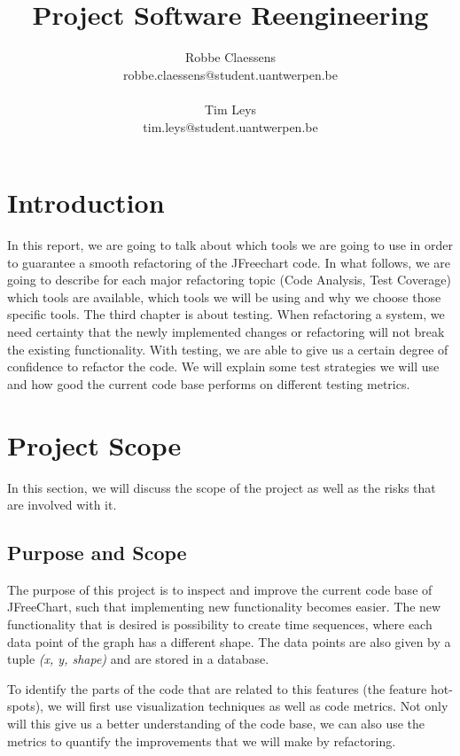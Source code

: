 \documentclass[]{article}
\title{Project Software Reengineering}
\author{Robbe Claessens \\ robbe.claessens@student.uantwerpen.be \\ \\Tim Leys\\tim.leys@student.uantwerpen.be}
\begin{document}
\maketitle



\section{Introduction}
In this report, we are going to talk about which tools we are going to use in order to guarantee a smooth refactoring of the JFreechart code. In what follows, we are going to describe for each major refactoring topic (Code Analysis, Test Coverage) which tools are available, which tools we will be using and why we choose those specific tools. The third chapter is about testing. When refactoring a system, we need certainty that the newly implemented changes or refactoring will not break the existing functionality. With testing, we are able to give us a certain degree of confidence to refactor the code. We will explain some test strategies we will use and how good the current code base performs on different testing metrics.

\section{Project Scope}

In this section, we will discuss the scope of the project as well as the risks that are involved with it.

\subsection{Purpose and Scope}
The purpose of this project is to inspect and improve the current code base of JFreeChart, such that implementing new functionality becomes easier. The new functionality that is desired is possibility to create time sequences, where each data point of the graph has a different shape. The data points are also given by a tuple \textit{(x, y, shape)} and are stored in a database. 

To identify the parts of the code that are related to this features (the feature hot-spots), we will first use visualization techniques as well as code metrics. Not only will this give us a better understanding of the code base, we can also use the metrics to quantify the improvements that we will make by refactoring.
\end{document}
